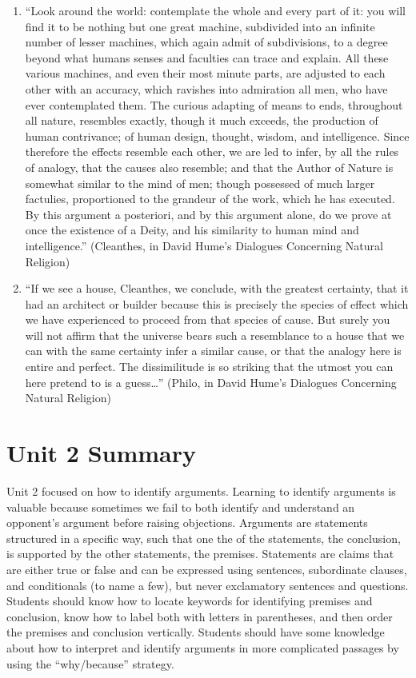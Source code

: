 \documentclass[
]{book}
\begin{document}
\begin{enumerate}
\item
  ``Look around the world: contemplate the whole and every part of it: you will find it to be nothing but one great machine, subdivided into an infinite number of lesser machines, which again admit of subdivisions, to a degree beyond what humans senses and faculties can trace and explain. All these various machines, and even their most minute parts, are adjusted to each other with an accuracy, which ravishes into admiration all men, who have ever contemplated them. The curious adapting of means to ends, throughout all nature, resembles exactly, though it much exceeds, the production of human contrivance; of human design, thought, wisdom, and intelligence. Since therefore the effects resemble each other, we are led to infer, by all the rules of analogy, that the causes also resemble; and that the Author of Nature is somewhat similar to the mind of men; though possessed of much larger factulies, proportioned to the grandeur of the work, which he has executed. By this argument a posteriori, and by this argument alone, do we prove at once the existence of a Deity, and his similarity to human mind and intelligence.'' (Cleanthes, in David Hume's Dialogues Concerning Natural Religion)
\item
  ``If we see a house, Cleanthes, we conclude, with the greatest certainty, that it had an architect or builder because this is precisely the species of effect which we have experienced to proceed from that species of cause. But surely you will not affirm that the universe bears such a resemblance to a house that we can with the same certainty infer a similar cause, or that the analogy here is entire and perfect. The dissimilitude is so striking that the utmost you can here pretend to is a guess\ldots{}'' (Philo, in David Hume's Dialogues Concerning Natural Religion)
\end{enumerate}

\hypertarget{unit-2-summary}{%
\section*{Unit 2 Summary}\label{unit-2-summary}}

Unit 2 focused on how to identify arguments. Learning to identify arguments is valuable because sometimes we fail to both identify and understand an opponent's argument before raising objections. Arguments are statements structured in a specific way, such that one the of the statements, the conclusion, is supported by the other statements, the premises. Statements are claims that are either true or false and can be expressed using sentences, subordinate clauses, and conditionals (to name a few), but never exclamatory sentences and questions. Students should know how to locate keywords for identifying premises and conclusion, know how to label both with letters in parentheses, and then order the premises and conclusion vertically. Students should have some knowledge about how to interpret and identify arguments in more complicated passages by using the ``why/because'' strategy.
\end{document}
